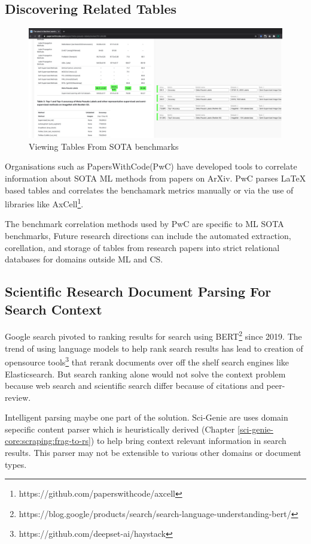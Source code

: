 \subsection{Discovering Related Tables}
\begin{figure}[h]
    \centering
    \includegraphics[width=\maxwidth{\textwidth}]{src/images/pwc-table-exp.pdf}
    \caption{ Viewing Tables From SOTA benchmarks }
    \label{figure\arabic{figurecounter}}
\end{figure}
Organisations such as PapersWithCode(PwC) have developed tools to correlate information about SOTA ML methods from papers on ArXiv. PwC parses LaTeX based tables and correlates the benchamark metrics manually or via the use of libraries like AxCell\footnote{https://github.com/paperswithcode/axcell}. 

The benchmark correlation methods used by PwC are specific to ML SOTA benchmarks, Future research directions can include the automated extraction, corellation, and storage of tables from research papers into strict relational databases for domains outside ML and CS. 

\subsection{Scientific Research Document Parsing For Search Context}
Google search pivoted to ranking results for search using BERT\footnote{https://blog.google/products/search/search-language-understanding-bert/} since 2019. The trend of using language models to help rank search results has lead to creation of opensource tools\footnote{https://github.com/deepset-ai/haystack} that rerank documents over off the shelf search engines like Elasticsearch. But search ranking alone would not solve the context problem because web search and scientific search differ because of citations and peer-review.

Intelligent parsing maybe one part of the solution. Sci-Genie are uses domain sepecific content parser which is heuristically derived (Chapter \ref{sci-genie-core:scraping:frag-to-rs}) to help bring context relevant information in search results. This parser may not be extensible to various other domains or document types.

